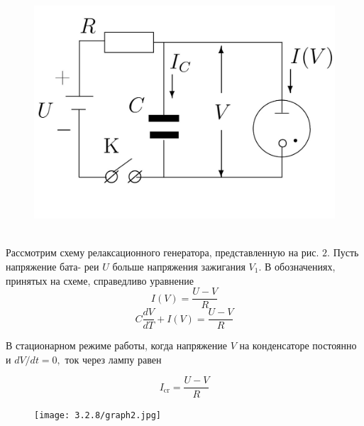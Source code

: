 \documentclass[a4paper,12pt]{article} %
\begin{document}
\begin{figure} 
\begin{center}
\includegraphics[width=1\textwidth]{scheme.jpg}
\caption{}
\label{osc}
\end{center}
\end{figure}

\\

Рассмотрим схему релаксационного генератора, представленную на рис. $2 .$ Пусть напряжение бата- реи $U$ больше напряжения зажигания $V_{1} .$ В обозначениях, принятых на схеме, справедливо уравнение
\begin{equation*}
I(V)=\frac{U-V}{R}
\end{equation*}
\begin{equation}
C \frac{d V}{d T}+I(V)=\frac{U-V}{R}
\end{equation}


В стационарном режиме работы, когда напряжение $V$ на конденсаторе постоянно и $d V / d t=0,$ ток через лампу равен

\begin{equation}
    I_{\mathrm{cr}}=\frac{U-V}{R}
\end{equation}

\begin{figure} 
\begin{center}
\texttt{[image: 3.2.8/graph2.jpg]}
\caption{}
\end{center}
\end{figure}
\end{document}
